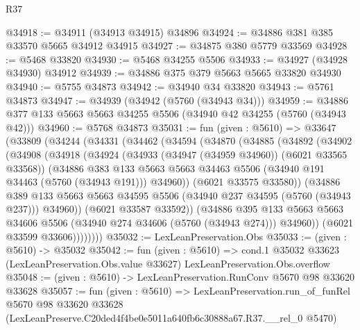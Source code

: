\begin{lexlean}{R37}
\begin{coremodule}
@34918 := @34911 (@34913 @34915) @34896
@34924 := @34886 @381 @385 @33570 @5665 @34912 @34915
@34927 := @34875 @380 @5779 @33569
@34928 := @5468 @33820
@34930 := @5468 @34255 @5506
@34933 := @34927 (@34928 @34930) @34912
@34939 := @34886 @375 @379 @5663 @5665 @33820 @34930
@34940 := @5755 @34873
@34942 := @34940 @34 @33820
@34943 := @5761 @34873
@34947 := @34939 (@34942 (@5760 (@34943 @34)))
@34959 := @34886 @377 @133 @5663 @5663 @34255 @5506 (@34940 @42 @34255 (@5760 (@34943 @42)))
@34960 := @5768 @34873
@35031 := fun (given : @5610) =>
  @33647
    (@33809
      (@34244
        (@34331
          (@34462
            (@34594
              (@34870
                (@34885
                  (@34892
                    (@34902
                      (@34908
                        (@34918
                          (@34924
                            (@34933 (@34947 (@34959 @34960)) (@6021 @33565 @33568))
                            (@34886
                              @383
                              @133
                              @5663
                              @5663
                              @34463
                              @5506
                              (@34940 @191 @34463 (@5760 (@34943 @191)))
                              @34960))
                          (@6021 @33575 @33580))
                        (@34886
                          @389
                          @133
                          @5663
                          @5663
                          @34595
                          @5506
                          (@34940 @237 @34595 (@5760 (@34943 @237)))
                          @34960))
                      (@6021 @33587 @33592))
                    (@34886
                      @395
                      @133
                      @5663
                      @5663
                      @34606
                      @5506
                      (@34940 @274 @34606 (@5760 (@34943 @274)))
                      @34960))
                  (@6021 @33599 @33606))))))))
@35032 := LexLeanPreservation.Obs
@35033 := (given : @5610) -> @35032
@35042 := fun (given : @5610) =>
  cond.{1} @35032 @33623 (LexLeanPreservation.Obs.value @33627) LexLeanPreservation.Obs.overflow
@35048 := (given : @5610) -> LexLeanPreservation.RunConv @5670 @98 @33620 @33628
@35057 := fun (given : @5610) =>
  LexLeanPreservation.run_of_funRel
    @5670
    @98
    @33620
    @33628
    (LexLeanPreserve.C20ded4f4be0e5011a640fb6c30888a67.R37.__rel_0 @5470)
\end{coremodule}
\end{lexlean}
